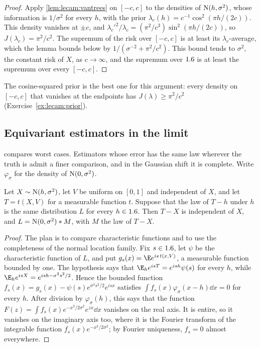 \begin{refsection}
\begin{proof}
Apply \cref{lem:lecam:vantrees} on $[-c,c]$ to the densities of $\mathrm{N}(h,\sigma^2)$, whose information is $1/\sigma^2$ for every $h$, with the prior $\lambda_c(h)=c^{-1}\cos^2(\pi h/(2c))$. This density vanishes at $\pm c$, and $\lambda_c'^2/\lambda_c=(\pi^2/c^3)\sin^2(\pi h/(2c))$, so $J(\lambda_c)=\pi^2/c^2$. The supremum of the risk over $[-c,c]$ is at least its $\lambda_c$-average, which the lemma bounds below by $1/(\sigma^{-2}+\pi^2/c^2)$. This bound tends to $\sigma^2$, the constant risk of $X$, as $c\to\infty$, and the supremum over $1.6$ is at least the supremum over every $[-c,c]$.
\end{proof}

The cosine-squared prior is the best one for this argument: every density on $[-c,c]$ that vanishes at the endpoints has $J(\lambda)\ge\pi^2/c^2$ (Exercise~\ref{ex:lecam:prior}).

\subsection{Equivariant estimators in the limit}

 compares worst cases. Estimators whose error has the same law wherever the truth is admit a finer comparison, and in the Gaussian shift it is complete. Write $\varphi_\sigma$ for the density of $\mathrm{N}(0,\sigma^2)$.

\begin{proposition}\label{prop:lecam:convolution-limit}
Let $X\sim\mathrm{N}(h,\sigma^2)$, let $V$ be uniform on $[0,1]$ and independent of $X$, and let $T=t(X,V)$ for a measurable function $t$. Suppose that the law of $T-h$ under $h$ is the same distribution $L$ for every $h\in1.6$. Then $T-X$ is independent of $X$, and $L=\mathrm{N}(0,\sigma^2)*M$, with $M$ the law of $T-X$.
\end{proposition}

\begin{proof}
The plan is to compare characteristic functions and to use the completeness of the normal location family. Fix $s\in1.6$, let $\psi$ be the characteristic function of $L$, and put $g_s(x)=\E e^{is\,t(x,V)}$, a measurable function bounded by one. The hypothesis says that $\E_he^{isT}=e^{ish}\psi(s)$ for every $h$, while $\E_he^{isX}=e^{ish-\sigma^2s^2/2}$. Hence the bounded function $f_s(x)=g_s(x)-\psi(s)e^{\sigma^2s^2/2}e^{isx}$ satisfies $\int f_s(x)\varphi_\sigma(x-h)\dd x=0$ for every $h$. After division by $\varphi_\sigma(h)$, this says that the function $F(z)=\int f_s(x)e^{-x^2/2\sigma^2}e^{zx}\dd x$ vanishes on the real axis. It is entire, so it vanishes on the imaginary axis too, where it is the Fourier transform of the integrable function $f_s(x)e^{-x^2/2\sigma^2}$; by Fourier uniqueness, $f_s=0$ almost everywhere.


\end{proof}
\end{refsection}

